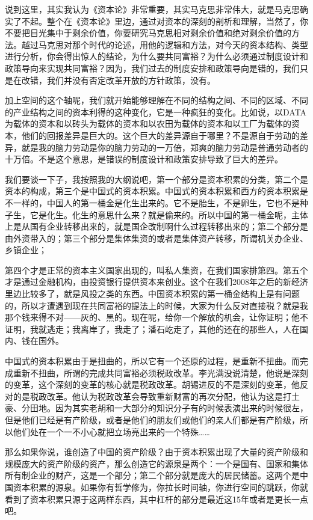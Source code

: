 \documentclass[UTF8, 12pt, a4paper]{ctexrep}
\begin{document}
说到这里，其实我认为《资本论》非常重要，其实马克思非常伟大，就是马克思确实了不起。整个在《资本论》里边，通过对资本的深刻的剖析和理解，当然了，你不要把目光集中于剩余价值，你要研究马克思相对剩余价值和绝对剩余价值的方法。越过马克思对那个时代的论述，用他的逻辑和方法，对今天的资本结构、类型进行分析，你会得出惊人的结论，为什么要共同富裕？为什么必须通过制度设计和政策导向来实现共同富裕？因为，我们过去的制度安排和政策导向是错的，我们只是在改错，我们并没有否定改革开放的方针政策，没有。

加上空间的这个轴呢，我们就开始能够理解在不同的结构之间、不同的区域、不同的产业结构之间的资本利得的这种变化，它是一种疯狂的变化。比如说，以DATA为载体的资本和以砖头为载体的资本和以农田为载体的资本和以工厂为载体的资本，他们的回报差异是巨大的。这个巨大的差异源自于哪里？不是源自于劳动的差异，就是我的脑力劳动是你的脑力劳动的一万倍，郑爽的脑力劳动是普通劳动者的十万倍。不是这个意思，是错误的制度设计和政策安排导致了巨大的差异。

我们要谈一下子，我按照我的大纲说吧，第一个部分是资本积累的分类，第二个是资本的构成，第三个是中国式的资本积累。中国式的资本积累和西方的资本积累是不一样的，中国人的第一桶金是化生出来的。它不是胎生，不是卵生，它也不是种子生，它是化生。化生的意思什么来？就是偷来的。所以中国的第一桶金呢，主体上是从国有企业转移出来的，就是国企改制啊什么过程转移出来的；第二个部分是由外资带入的；第三个部分是集体集资的或者是集体资产转移，所谓机关办企业、乡镇企业；

第四个才是正常的资本主义国家出现的，叫私人集资，在我们国家排第四。第五个才是通过金融机构，由投资银行提供资本来创业。这个在我们2008年之后的新经济里边比较多了，就是风投之类的东西。中国资本积累的第一桶金结构上是有问题的，所以才遭遇到现在共同富裕的提法上的时候，大家为什么反对直接税？就是我那个钱来得不对——灰的、黑的。现在呢，给你一个解放的机会，让你证明；他不证明，我就逃走；我离岸了，我走了；潘石屹走了，其他的还在的那些人，人在国内、钱在国外。

中国式的资本积累由于是扭曲的，所以它有一个还原的过程，是重新不扭曲。而完成重新不扭曲，所谓的完成共同富裕必须税政改革。李光满没说清楚，他说是深刻的变革，这个深刻的变革的核心就是税政改革。胡锡进反的不是深刻的变革，他反对的是税政改革。他认为税政改革会导致重新财富的再次分配，他认为这是打土豪、分田地。因为其实老胡和一大部分的知识分子有的时候表演出来的时候很左，但是他们已经是有产阶级，或者是他们的朋友们或他们的亲人们都是有产阶级，所以他们处在一个一不小心就把立场亮出来的一个特殊……

那么如果你说，谁创造了中国的资产阶级？由于资本积累出现了大量的资产阶级和规模庞大的资产阶级的资产，那么创造它的源泉是两个：一个是国有、国家和集体所有制企业的财产，这是一个部分；第二个部分就是庞大的居民储蓄。这两个是中国资本积累的源泉。如果你有哲学修为，你拉长时间轴，你进行空间的跳跃，你就看到了资本积累只源于这两样东西，其中杠杆的部分是最近这15年或者是更长一点吧。
\end{document}
